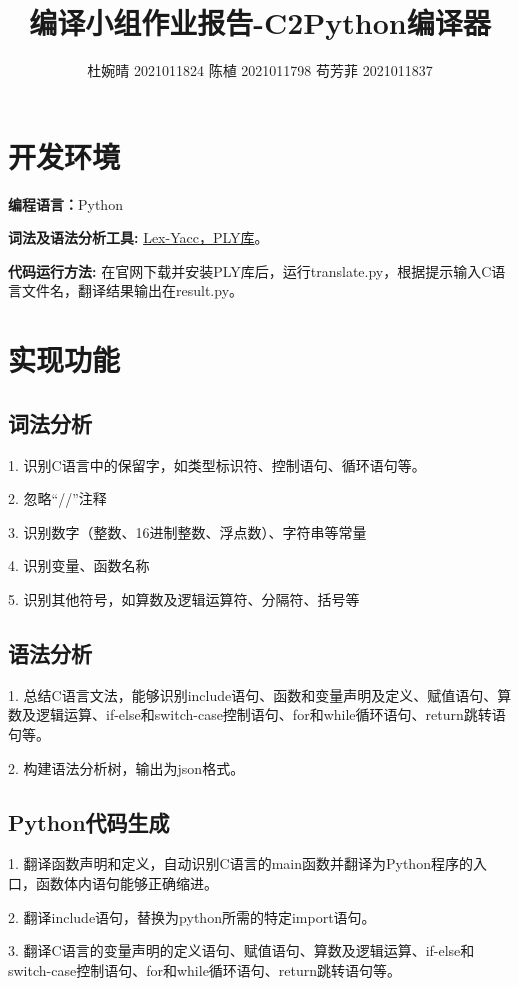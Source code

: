 \documentclass{article}
\begin{document}
\title{\textbf{编译小组作业报告-C2Python编译器}}
\author{杜婉晴 2021011824 陈植 2021011798 苟芳菲 2021011837}
\maketitle \thispagestyle{empty}
\section{开发环境}

\textbf{编程语言：}Python

\textbf{词法及语法分析工具: }
\href{https://tastones.com/stackoverflow/python-language/python-lex-yacc/getting_started_with_ply/}{Lex-Yacc，PLY库}。

\textbf{代码运行方法: }在官网下载并安装PLY库后，运行translate.py，根据提示输入C语言文件名，翻译结果输出在result.py。

\section{实现功能}
\subsection{词法分析}
1. 识别C语言中的保留字，如类型标识符、控制语句、循环语句等。

2. 忽略“//”注释

3. 识别数字（整数、16进制整数、浮点数）、字符串等常量

4. 识别变量、函数名称

5. 识别其他符号，如算数及逻辑运算符、分隔符、括号等

\subsection{语法分析}
1. 总结C语言文法，能够识别include语句、函数和变量声明及定义、赋值语句、算数及逻辑运算、if-else和switch-case控制语句、for和while循环语句、return跳转语句等。


2. 构建语法分析树，输出为json格式。

\subsection{Python代码生成}
1. 翻译函数声明和定义，自动识别C语言的main函数并翻译为Python程序的入口，函数体内语句能够正确缩进。

2. 翻译include语句，替换为python所需的特定import语句。

3. 翻译C语言的变量声明的定义语句、赋值语句、算数及逻辑运算、if-else和switch-case控制语句、for和while循环语句、return跳转语句等。
\end{document}
